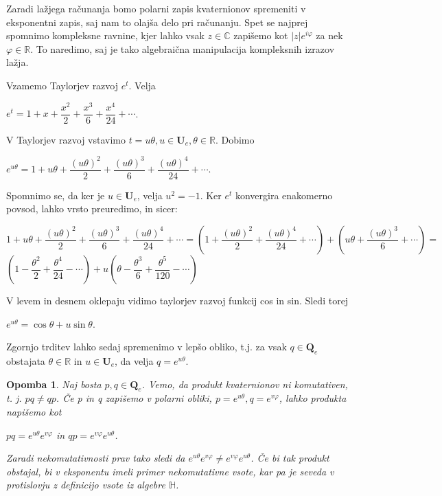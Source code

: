 \documentclass[a4paper,12pt]{article}
\def\R{\mathbb{R}} %
\def\C{\mathbb{C}} %
\def\H{\mathbb{H}} %
\def\Qe{\textbf{Q}_{e}} %
\def\Ue{\textbf{U}_{e}} %
\newtheorem{opomba}{Opomba}
\begin{document}
Zaradi lažjega računanja bomo polarni zapis kvaternionov spremeniti v eksponentni zapis,
saj nam to olajša delo pri računanju. Spet se najprej spomnimo kompleksne ravnine, kjer lahko
vsak $z \in \C$ zapišemo kot $|z|e^{i\varphi}$ za nek $\varphi \in \R$. To naredimo, saj je tako
algebraična manipulacija kompleksnih izrazov lažja.

Vzamemo Taylorjev razvoj $e^t$. Velja
\begin{center}
   $e^t = 1+x+\dfrac{x^2}{2}+\dfrac{x^3}{6}+\dfrac{x^4}{24} + \cdots$.
\end{center}
V Taylorjev razvoj vstavimo $t = u\theta, u \in \Ue, \theta \in \R$. Dobimo %
\begin{center}
   $e^{u\theta} = 1 + u\theta + \dfrac{(u\theta)^2}{2} + \dfrac{(u\theta)^3}{6} + \dfrac{(u\theta)^4}{24} + \cdots$.
\end{center}
Spomnimo se, da ker je $u \in \Ue$, velja $u^2=-1$. Ker $e^t$ konvergira enakomerno povsod, lahko vrsto preuredimo, in sicer:
\begin{center}
   $1 + u\theta + \dfrac{(u\theta)^2}{2} + \dfrac{(u\theta)^3}{6} + \dfrac{(u\theta)^4}{24} + \cdots = (1 + \dfrac{(u\theta)^2}{2} + \dfrac{(u\theta)^4}{24}+ \cdots) + (u\theta + \dfrac{(u\theta)^3}{6} + \cdots) = $
   $(1-\dfrac{\theta^2}{2}+\dfrac{\theta^4}{24}- \cdots) + u(\theta - \dfrac{\theta^3}{6} +\dfrac{\theta^5}{120} - \cdots)$
\end{center}
\break
V levem in desnem oklepaju vidimo taylorjev razvoj funkcij cos in sin. Sledi torej
\begin{center}
   $e^{u\theta} = \cos\theta  + u\sin\theta$.
\end{center}
Zgornjo trditev lahko sedaj spremenimo v lepšo obliko, t.j. za vsak $q \in \Qe$ obstajata
$\theta \in \R$ in $u \in \Ue$, da velja $q =  e^{u\theta}$.

\begin{opomba} 
Naj bosta $p,q \in \Qe$. Vemo, da produkt kvaternionov ni komutativen, t. j. $p q \neq q p$. Če p in q zapišemo v polarni obliki, 
$p = e^{u\theta}, q = e^{v\varphi}$, lahko produkta napišemo kot
\begin{center}
   $p q = e^{u\theta} e^{v\varphi}$ in $q p = e^{v\varphi}e^{u\theta}$.
\end{center}
Zaradi nekomutativnosti prav tako sledi da $e^{u\theta} e^{v\varphi} \neq e^{v\varphi}e^{u\theta}$. Če bi tak produkt obstajal, bi v eksponentu imeli primer nekomutativne vsote,
kar pa je seveda v protislovju z definicijo vsote iz algebre $\H$.
\end{opomba}
\end{document}
